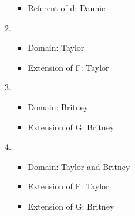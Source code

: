 \begin{enumerate}
\begin{enumerate}
{\begin{itemize}
	  \item Referent of d: Dannie

	\end{itemize}

}


	\item {}

	 \opts{

	  \dotline
	  \dotline
	  \dotline
	  \dotline
	  \dotline

	 }
	 {

	 \begin{itemize}

	 \item Domain: Taylor

	\item Extension of F: Taylor

  \end{itemize}

 }

	\item {}

	 \opts{

	  \dotline
	  \dotline
	  \dotline
	  \dotline
	  \dotline

	 }
	 {
	\begin{itemize}

	 \item Domain: Britney

	 \item Extension of G: Britney

	\end{itemize}

	 }

	\item {}

	 \opts{

	  \dotline
	  \dotline
	  \dotline
	  \dotline
	  \dotline

	 }
	 {
	
	  \begin{itemize}

	   \item Domain: Taylor and Britney

	   \item Extension of F: Taylor

	   \item Extension of G: Britney

	  \end{itemize}
	 

	 }


\end{enumerate}
\end{enumerate}
